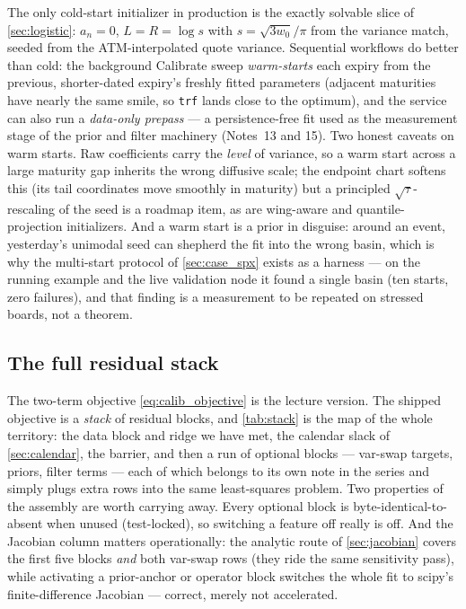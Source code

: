 \documentclass[11pt]{article}
\begin{document}
The only cold-start initializer in production is the exactly solvable slice
of \cref{sec:logistic}: $a_n=0$, $L=R=\log s$ with $s=\sqrt{3w_0}/\pi$ from
the variance match, seeded from the ATM-interpolated quote variance.
Sequential workflows do better than cold: the background Calibrate sweep
\emph{warm-starts} each expiry from the previous, shorter-dated expiry's
freshly fitted parameters (adjacent maturities have nearly the same smile, so
\texttt{trf} lands close to the optimum), and the service can also run a
\emph{data-only prepass} --- a persistence-free fit used as the measurement
stage of the prior and filter machinery (Notes~13 and 15).  Two honest
caveats on warm starts.  Raw coefficients carry the \emph{level} of
variance, so a warm start across a large maturity gap inherits the wrong
diffusive scale; the endpoint chart softens this (its tail coordinates move
smoothly in maturity) but a principled $\sqrt{\tau}$-rescaling of the seed
is a roadmap item, as are wing-aware and quantile-projection initializers.
And a warm start is a prior in disguise: around an event, yesterday's
unimodal seed can shepherd the fit into the wrong basin, which is why the
multi-start protocol of \cref{sec:case_spx} exists as a harness --- on the
running example and the live validation node it found a single basin (ten
starts, zero failures), and that finding is a measurement to be repeated on
stressed boards, not a theorem.

\subsection{The full residual stack}
\label{sec:stack}

The two-term objective \eqref{eq:calib_objective} is the lecture version.
The shipped objective is a \emph{stack} of residual blocks, and
\cref{tab:stack} is the map of the whole territory: the data block and ridge
we have met, the calendar slack of \cref{sec:calendar}, the barrier, and
then a run of optional blocks --- var-swap targets, priors, filter terms ---
each of which belongs to its own note in the series and simply plugs extra
rows into the same least-squares problem.  Two properties of the assembly
are worth carrying away.  Every optional block is byte-identical-to-absent
when unused (test-locked), so switching a feature off really is off.  And
the Jacobian column matters operationally: the analytic route of
\cref{sec:jacobian} covers the first five blocks \emph{and} both var-swap
rows (they ride the same sensitivity pass), while activating a prior-anchor
or operator block switches the whole fit to scipy's finite-difference
Jacobian --- correct, merely not accelerated.
\end{document}
